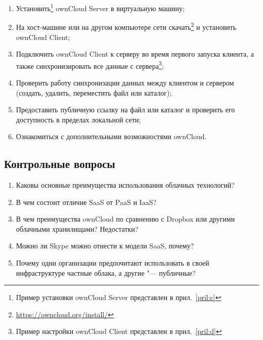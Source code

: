 \begin{enumerate}
    \item Установить\footnote{Пример установки ownCloud Server представлен в прил.~\ref{pril:c}} ownCloud Server в виртуальную машину;
    \item На хост-машине или на другом компьютере сети скачать\footnote{\url{https://owncloud.org/install/}} и установить ownCloud Client;
    \item Подключить ownCloud Client к серверу во время первого запуска клиента, а также синхронизировать все данные с сервера\footnote{Пример настройки ownCloud Client представлен в прил.~\ref{pril:d}};
    \item Проверить работу синхронизации данных между клиентом и сервером (создать, удалить, переместить файл или каталог);
    \item Предоставить публичную ссылку на файл или каталог и проверить его доступность в пределах локальной сети;
    \item Ознакомиться с дополнительными возможностями ownCloud.
\end{enumerate}

\subsection{Контрольные вопросы}
\begin{enumerate}
    \item Каковы основные преимущества использования облачных технологий?
    \item В чем состоит отличие SaaS от PaaS и IaaS?
    \item В чем преимущества ownCloud по сравнению с Dropbox или другими облачными хранилищами? Недостатки?
    \item Можно ли Skype можно отнести к модели SaaS, почему?
    \item Почему одни организации предпочитают использовать в своей инфраструктуре частные облака, а другие "--- публичные?
\end{enumerate}

\clearpage
